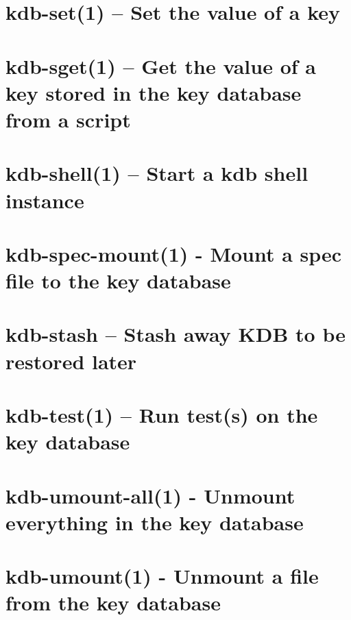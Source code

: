 \let\mypdfximage\pdfximage\def\pdfximage{\immediate\mypdfximage}\documentclass[twoside]{book}
\newcommand{\+}{\discretionary{\mbox{\scriptsize$\hookleftarrow$}}{}{}}
\begin{document}
\chapter{kdb-\/set(1) -- Set the value of a key}
\label{doc_help_kdb-set_md}

\chapter{kdb-\/sget(1) -- Get the value of a key stored in the key database from a script}
\label{doc_help_kdb-sget_md}

\chapter{kdb-\/shell(1) -- Start a kdb shell instance}
\label{doc_help_kdb-shell_md}

\chapter{kdb-\/spec-\/mount(1) -\/ Mount a spec file to the key database}
\label{doc_help_kdb-spec-mount_md}

\chapter{kdb-\/stash -- Stash away K\+DB to be restored later}
\label{doc_help_kdb-stash_md}

\chapter{kdb-\/test(1) -- Run test(s) on the key database}
\label{doc_help_kdb-test_md}

\chapter{kdb-\/umount-\/all(1) -\/ Unmount everything in the key database}
\label{doc_help_kdb-umount-all_md}

\chapter{kdb-\/umount(1) -\/ Unmount a file from the key database}
\label{doc_help_kdb-umount_md}

\end{document}
